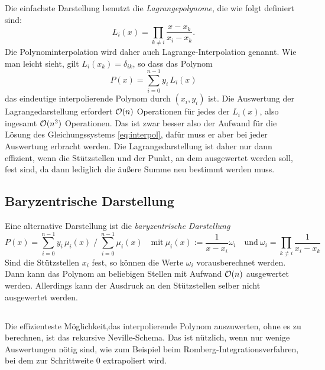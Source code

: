 Die einfachste Darstellung benutzt die \emph{Lagrangepolynome}, die
wie folgt definiert sind:
\begin{equation}
  \label{eq:lagrange}
  L_i(x) = \prod_{k\neq i} \frac{x-x_k}{x_i-x_k}.
\end{equation}
Die Polynominterpolation wird daher auch Lagrange-Interpolation
genannt.  Wie man leicht sieht, gilt $L_i(x_k) = \delta_{ik}$, so dass
das Polynom
\begin{equation}
  P(x) = \sum_{i=0}^{n-1} y_i\,L_i(x)
\end{equation}
das eindeutige interpolierende Polynom durch $(x_i, y_i)$ ist. Die
Auswertung der Lagrangedarstellung erfordert $\mathcal O(n)$ Operationen für
jedes der $L_i(x)$, also ingesamt $\mathcal O(n^2)$ Operationen. Das ist zwar
besser also der Aufwand für die Lösung des Gleichungssystems
\eqref{eq:interpol}, dafür muss er aber bei jeder Auswertung erbracht
werden.  Die Lagrangedarstellung ist daher nur dann effizient, wenn
die Stützstellen und der Punkt, an dem ausgewertet werden soll, fest
sind, da dann lediglich die äußere Summe neu bestimmt werden muss.

\subsection{Baryzentrische Darstellung}
%
Eine alternative Darstellung ist die \emph{baryzentrische Darstellung}
\begin{equation}
P(x) = \sum_{i=0}^{n-1} y_i\, \mu_i(x) \; \Big/ \; \sum_{i=0}^{n-1}
\mu_i(x)\quad\text{mit}~
\mu_i(x) := \frac{1}{x-x_i}\omega_i \quad\text{und}~
\omega_i = \prod_{k\neq i}\frac{1}{x_i-x_k}
\end{equation}
Sind die Stützstellen $x_i$ fest, so können die Werte $\omega_i$
vorausberechnet werden. Dann kann das Polynom an beliebigen Stellen
mit Aufwand $\mathcal O(n)$ ausgewertet werden. Allerdings kann der Ausdruck
an den Stützstellen selber nicht ausgewertet werden.

\subsection{}

Die effizienteste Möglichkeit,das interpolierende Polynom auszuwerten,
ohne es zu berechnen, ist das rekursive Neville-Schema. Das ist
nützlich, wenn nur wenige Auswertungen nötig sind, wie zum Beispiel
beim Romberg-Integrationsverfahren, bei dem zur Schrittweite 0
extrapoliert wird.

